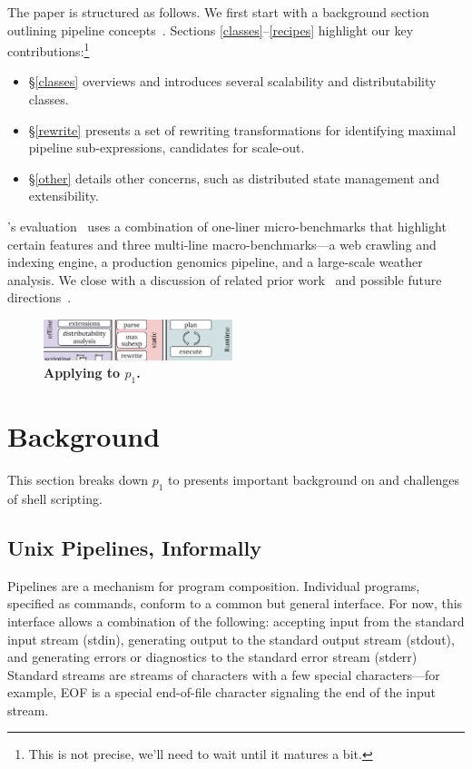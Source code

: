 \documentclass[sigplan,10pt,review,anonymous]{acmart}
\begin{document}
The paper is structured as follows.
We first start with a background section outlining pipeline concepts~.
Sections \ref{classes}--\ref{recipes} highlight our key contributions:\footnote{
  This is not precise, we'll need to wait until it matures a bit.
}
\begin{itemize}

  \item
  \S\ref{classes} overviews \sys and introduces several scalability and distributability classes.

  \item
  \S\ref{rewrite} presents a set of rewriting transformations for identifying maximal pipeline sub-expressions, candidates for scale-out.

  \item
  \S\ref{other} details other concerns, such as distributed state management and extensibility.
\end{itemize}

\noindent
\sys's evaluation~ uses a combination of one-liner micro-benchmarks that highlight certain features and three multi-line macro-benchmarks---a web crawling and indexing engine, a production genomics pipeline, and a large-scale weather analysis.
We close with a discussion of related prior work~ and possible future directions~.

\begin{figure}[t]
\centering
\includegraphics[width=0.49\textwidth]{./figs/dish_overview.pdf}
\caption{
  \textbf{Applying \sys to $p_1$.}
}
\label{fig:example}
\end{figure}


\section{Background}
\label{bg}

This section breaks down $p_1$ to presents important background on and challenges
of shell scripting.

\subsection{Unix Pipelines, Informally}
\label{bg:pipelines}

Pipelines are a mechanism for program composition.
Individual programs, specified as commands, conform to a common but general interface. 
For now, this interface allows a combination of the following:
  accepting input from the standard input stream (stdin),
  generating output to the standard output stream (stdout), and
  generating errors or diagnostics to the standard error stream (stderr)
Standard streams are streams of characters with a few special characters---for example, EOF is a special end-of-file character signaling the end of the input stream.
\end{document}
